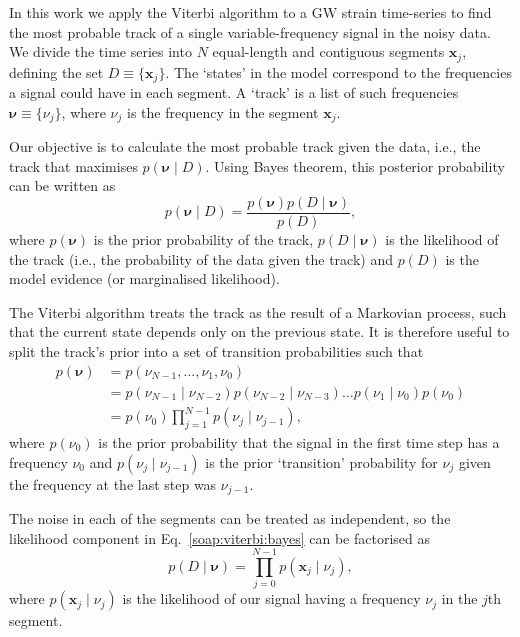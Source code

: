 %
%
In this work we apply the Viterbi algorithm to a \gls{GW} strain time-series to find the most probable track of a single variable-frequency signal in the noisy data.  We divide the time series into $N$ equal-length and contiguous segments ${\bm x}_j$,  defining the set $D \equiv \{{\bm x}_j\}$. The `states' in the model correspond to the frequencies a signal could have in each segment. A `track' is a list of such frequencies ${\bm \nu}\equiv \{\nu_j\}$, where  $\nu_j$ is the frequency in the segment ${\bm x_j}$.

%
%
Our objective is to calculate the most probable track given the data, i.e., the
track that maximises $p({\bm \nu}\mid D)$. Using Bayes theorem, this posterior probability can
be written as
%
\begin{equation}
\label{soap:viterbi:bayes}
  p({\bm \nu} \mid D) = \frac{p({\bm \nu})p(D \mid {\bm \nu})}{p(D)},
\end{equation}
%
where $p({\bm \nu}) $ is the prior probability of the
track, $p(D \mid{\bm \nu})$ is the likelihood of the track (i.e., the
probability of the data given the track) and $p(D)$ is the model evidence (or
marginalised likelihood).

The Viterbi algorithm treats the track as the result of a Markovian process,
such that the current state depends only on the previous state. It is
therefore useful to split the track's prior into a set of transition
probabilities such that
%
\begin{align}
\label{soap:viterbi:prior}
p({\bm \nu}) &= p(\nu_{N - 1}, \ldots, \nu_1, \nu_0)\nonumber \\
&= p(\nu_{N - 1} \mid \nu_{N-2})p(\nu_{N-2} \mid \nu_{N-3}) \dots p(\nu_1 \mid \nu_0)p(\nu_0) \nonumber \\
&= p(\nu_0)\prod_{j=1}^{N-1}p(\nu_{j} \mid \nu_{j-1}),
\end{align}
%
where $p(\nu_0)$ is the prior probability that the signal in the first time
step has a frequency $\nu_0$ and $p(\nu_{j} \mid \nu_{j-1})$ is the
prior `transition' probability for $\nu_j$ given the frequency at the last
step was $\nu_{j-1}$.

The noise in each of the segments can be treated as independent, so the
likelihood component in Eq.~\ref{soap:viterbi:bayes} can be factorised as
%
\begin{equation}
\label{soap:viterbi:likelihood}
p(D \mid {\bm \nu}) = \prod_{j=0}^{N-1}p({\bm x_j} \mid \nu_j),
\end{equation}
%
 where $p({\bm x_j} \mid \nu_j)$ is the likelihood of our
signal having a frequency $\nu_j$ in the $j$th segment.

